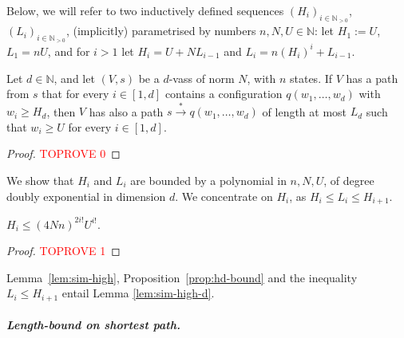 \documentclass[a4paper, UKenglish, cleveref, autoref, thm-restate]{lipics-v2021}
\newcommand{\N}{\mathbb{N}}
\newcommand{\trans}[1]{\stackrel{#1}{\longrightarrow}}
\newcommand{\tran}{\trans{*}}
\newcommand{\vass}{{\sc vass}\xspace}
\newcommand{\parvass}[1]{{$#1$-\vass}\xspace}
\newcommand{\para}[1]{\vspace{-3mm}\subparagraph*{\bf #1.}}
\newcommand{\setfromto}[2]{[#1, #2]}
\newcommand{\setto}[1]{\setfromto 1 {#1}}
\newcommand{\Npos}{\N_{>0}}
\begin{document}
\begin{appendixproof}
Below, we will refer to two inductively defined sequences $(H_i)_{i\in\Npos}$, $(L_i)_{i\in\Npos}$,
(implicitly) parametrised
by numbers $n, N, U \in \N$:
let $H_1 := U$, $L_1 = n U$, and for  $i > 1$ let $H_i = U + N L_{i-1}$ and  
$L_i = n (H_i)^i + L_{i-1}$.

\begin{lemma}\label{lem:sim-high}
Let $d \in \N$, and let $(V, s)$ be a \parvass d of norm $N$, with $n$ states.
If $V$ has a path from $s$ that for every $i\in\setto d$ contains a configuration 
$q(w_1, \ldots, w_d)$ with $w_i \geq H_d$,
then $V$ has also a path $s \tran q(w_1, \ldots, w_d)$ of length at most $L_d$
such that $w_i \geq U$ for every $i\in\setto d$.
\end{lemma}


\begin{proof}\textcolor{red}{TOPROVE 0}\end{proof}

We show that $H_i$ and $L_i$ are bounded by a polynomial in $n, N, U$, of
degree doubly exponential in dimension $d$.
We concentrate on $H_i$, as
$H_i \leq L_i \leq H_{i+1}$.

\begin{proposition}\label{prop:hd-bound}
$H_i \leq (4Nn)^{2i!} U^{i!}$.
\end{proposition}

\begin{proof}\textcolor{red}{TOPROVE 1}\end{proof}
Lemma~\ref{lem:sim-high}, Proposition~\ref{prop:hd-bound} and the inequality $L_i \leq H_{i+1}$
entail Lemma \ref{lem:sim-high-d}.
\end{appendixproof}


\para{Length-bound on shortest path}
\end{document}

